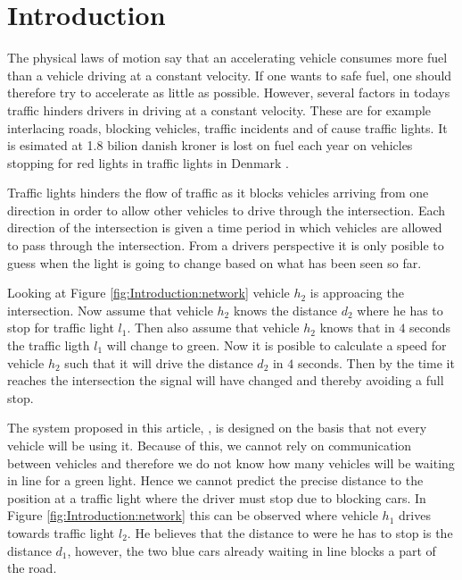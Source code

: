\section{Introduction}

The physical laws of motion say that an accelerating vehicle consumes more fuel than a vehicle driving at a constant velocity. %
If one wants to safe fuel, one should therefore try to accelerate as little as possible. 
However, several factors in todays traffic hinders drivers in driving at a constant velocity. 
These are for example interlacing roads, blocking vehicles, traffic incidents and of cause traffic lights. 
It is esimated at 1.8 bilion danish kroner is lost on fuel each year on vehicles stopping for red lights in traffic lights in Denmark \cite{Vejdir}.

Traffic lights hinders the flow of traffic as it blocks vehicles arriving from one direction in order to allow other vehicles to drive through the intersection.
Each direction of the intersection is given a time period in which vehicles are allowed to pass through the intersection. 
From a drivers perspective it is only posible to guess when the light is going to change based on what has been seen so far. 

Looking at Figure \ref{fig:Introduction:network} vehicle $h_2$ is approacing the intersection.
Now assume that vehicle $h_2$ knows the distance $d_2$ where he has to stop for traffic light $l_1$. 
Then also assume that vehicle $h_2$ knows that in $4$ seconds the traffic ligth $l_1$ will change to green. 
Now it is posible to calculate a speed for vehicle $h_2$ such that it will drive the distance $d_2$ in $4$ seconds. 
Then by the time it reaches the intersection the signal will have changed and thereby avoiding a full stop.

The system proposed in this article, \tech, is designed on the basis that not every vehicle will be using it. 
Because of this, we cannot rely on communication between vehicles and therefore we do not know how many vehicles will be waiting in line for a green light. %
Hence we cannot predict the precise distance to the position at a traffic light where the driver must stop due to blocking cars. 
In Figure \ref{fig:Introduction:network} this can be observed where vehicle $h_1$ drives towards traffic light $l_2$. 
He believes that the distance to were he has to stop is the distance $d_1$, however, the two blue cars already waiting in line blocks a part of the road.

